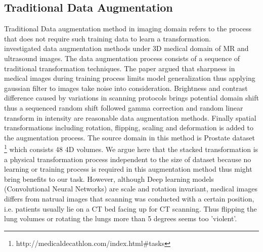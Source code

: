 \subsection{Traditional Data Augmentation}
Traditional Data augmentation method in imaging domain refers to the process that does not require such training data to learn a transformation.\\

\cite{zhang_when_2019} investigated data augmentation methods under 3D medical domain of MR and ultrasound images. 
The data augmentation process consists of a sequence of traditional transformation techniques. The paper argued that sharpness in medical images during training process limits model generalization thus applying gaussian filter to images take noise into consideration. Brightness and contrast difference caused by variations in scanning protocols brings potential domain shift thus a sequenced random shift followed gamma correction and random linear transform in intensity are reasonable data augmentation methods. Finally spatial transformations including rotation, flipping, scaling and deformation is added to the augmentation process.
The source domain in this method is Prostate dataset \footnote{http://medicaldecathlon.com/index.html\#tasks} which consists 48 4D volumes.
We argue here that the stacked transformation is a physical transformation process independent to the size of dataset because no learning or training process is required in this augmentation method thus might bring benefits to our task. However, although Deep learning models (Convolutional Neural Networks) are scale and rotation invariant, medical images differs from natrual images that scanning was conducted with a certain position, i.e. patients usually lie on a CT bed facing up for CT scanning. Thus flipping the lung volumes or rotating the lungs more than 5 degrees seems too 'violent'.\\


